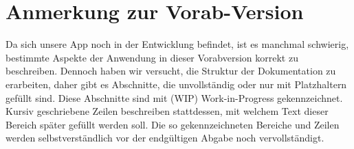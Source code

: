 \newpage
\section*{Anmerkung zur Vorab-Version}\label{sec:workInProgress}

Da sich unsere App noch in der Entwicklung befindet, ist es manchmal schwierig, bestimmte Aspekte der Anwendung in dieser Vorabversion korrekt zu beschreiben. Dennoch haben wir versucht, die Struktur der Dokumentation zu erarbeiten, daher gibt es Abschnitte, die unvollständig oder nur mit Platzhaltern gefüllt sind. Diese Abschnitte sind mit (WIP) Work-in-Progress gekennzeichnet. Kursiv geschriebene Zeilen beschreiben stattdessen, mit welchem Text dieser Bereich später gefüllt werden soll. Die so gekennzeichneten Bereiche und Zeilen werden selbstverständlich vor der endgültigen Abgabe noch vervollständigt.